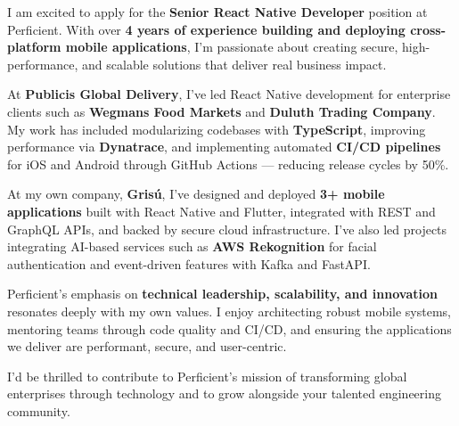 \documentclass[11pt,a4paper]{awesome-cv}
\begin{document}
\makecvheader[R]
\makelettertitle

\begin{cvletter}

I am excited to apply for the \textbf{Senior React Native Developer} position at Perficient. With over \textbf{4 years of experience building and deploying cross-platform mobile applications}, I’m passionate about creating secure, high-performance, and scalable solutions that deliver real business impact.

At \textbf{Publicis Global Delivery}, I’ve led React Native development for enterprise clients such as \textbf{Wegmans Food Markets} and \textbf{Duluth Trading Company}. My work has included modularizing codebases with \textbf{TypeScript}, improving performance via \textbf{Dynatrace}, and implementing automated \textbf{CI/CD pipelines} for iOS and Android through GitHub Actions — reducing release cycles by 50\%.  

At my own company, \textbf{Grisú}, I’ve designed and deployed \textbf{3+ mobile applications} built with React Native and Flutter, integrated with REST and GraphQL APIs, and backed by secure cloud infrastructure. I’ve also led projects integrating AI-based services such as \textbf{AWS Rekognition} for facial authentication and event-driven features with Kafka and FastAPI.  

Perficient’s emphasis on \textbf{technical leadership, scalability, and innovation} resonates deeply with my own values. I enjoy architecting robust mobile systems, mentoring teams through code quality and CI/CD, and ensuring the applications we deliver are performant, secure, and user-centric.  

I’d be thrilled to contribute to Perficient’s mission of transforming global enterprises through technology and to grow alongside your talented engineering community.

\end{cvletter}

\makeletterclosing
\end{document}
